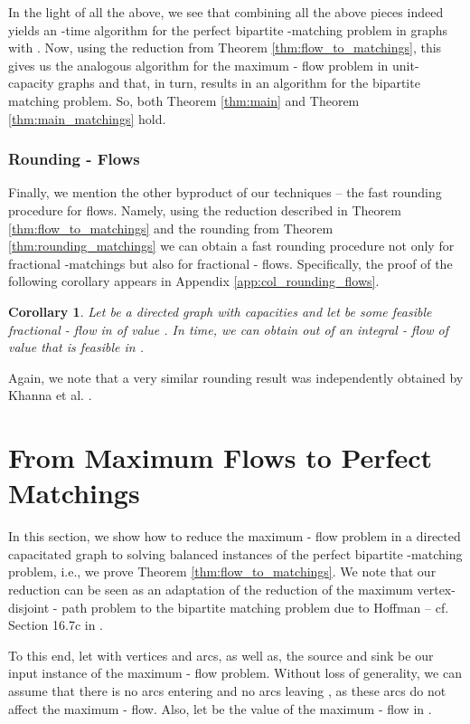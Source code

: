 \documentclass[11pt, letterpaper]{article}
\newtheorem{corollary}[theorem]{Corollary}
\begin{document}
In the light of all the above, we see that combining all the above pieces indeed yields an -time algorithm for the perfect bipartite -matching problem in graphs with . Now, using the reduction from Theorem \ref{thm:flow_to_matchings}, this gives us the analogous algorithm for the maximum - flow problem in unit-capacity graphs and that, in turn, results in an algorithm for the bipartite matching problem. So, both Theorem \ref{thm:main} and Theorem \ref{thm:main_matchings} hold.

\subsubsection*{Rounding - Flows}

Finally, we mention the other byproduct of our techniques -- the fast rounding procedure for flows. Namely, using the reduction described in Theorem \ref{thm:flow_to_matchings} and the rounding from Theorem \ref{thm:rounding_matchings} we can obtain a fast rounding procedure not only for fractional -matchings but also for fractional - flows. Specifically, the proof of the following corollary appears in Appendix \ref{app:col_rounding_flows}. 

\begin{corollary}\label{col:rounding_flows}
Let  be a directed graph with capacities and let  be some feasible fractional - flow in  of value . In  time, we can obtain out of  an integral - flow  of value  that is feasible in . 
\end{corollary} 

\noindent Again, we note that a very similar rounding result was independently obtained by Khanna et al. \cite{KhannaKL13}.  \section{From Maximum Flows to Perfect Matchings}\label{sec:reduction}

In this section, we show how to reduce the maximum - flow problem in a directed capacitated graph  to solving  balanced instances of the perfect bipartite -matching problem, i.e., we prove Theorem \ref{thm:flow_to_matchings}. We note that our reduction can be seen as an adaptation of the reduction of the maximum vertex-disjoint - path problem to the bipartite matching problem due to Hoffman \cite{Hoffman60} -- cf. Section 16.7c in \cite{Schrijver03}.

To this end, let  with  vertices and  arcs, as well as, the source  and sink  be our input instance of the maximum - flow problem. Without loss of generality, we can assume that there is no arcs entering  and no arcs leaving , as these arcs do not affect the maximum - flow. Also, let  be the value of the maximum - flow in .  
\end{document}
